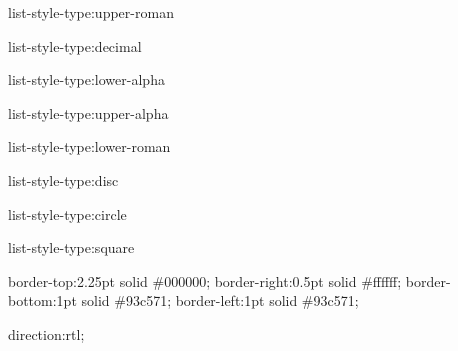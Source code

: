 \documentclass[12pt,twoside,openany]{book}
\newenvironment{lateiDocument}{}{}
\begin{document}
\begin{lateiDocument}
\begin{teiElement}[name={TEI}]
\begin{teiElement}[name={teiHeader}]
\begin{teiElement}[name={encodingDesc}]
\begin{teiElement}[name={tagsDecl}]
				\begin{teiElement}[name={rendition},xmlid={rendition\_list1},scheme={css}]
list-style-type:upper-roman
\end{teiElement}
				\begin{teiElement}[name={rendition},xmlid={rendition\_list2},scheme={css}]
list-style-type:decimal
\end{teiElement}
				\begin{teiElement}[name={rendition},xmlid={rendition\_list3},scheme={css}]
list-style-type:lower-alpha
\end{teiElement}
				\begin{teiElement}[name={rendition},xmlid={rendition\_list4},scheme={css}]
list-style-type:upper-alpha
\end{teiElement}
				\begin{teiElement}[name={rendition},xmlid={rendition\_list5},scheme={css}]
list-style-type:lower-roman
\end{teiElement}
				\begin{teiElement}[name={rendition},xmlid={rendition\_list6},scheme={css}]
list-style-type:disc
\end{teiElement}
				\begin{teiElement}[name={rendition},xmlid={rendition\_list7},scheme={css}]
list-style-type:circle
\end{teiElement}
				\begin{teiElement}[name={rendition},xmlid={rendition\_list8},scheme={css}]
list-style-type:square
\end{teiElement}
				\begin{teiElement}[name={rendition},scheme={css},xmlid={Cell}]
border-top:2.25pt solid \#000000; border-right:0.5pt
					solid \#ffffff; border-bottom:1pt solid \#93c571; border-left:1pt solid \#93c571; 
\end{teiElement}
				\begin{teiElement}[name={rendition},xmlid={rtl},scheme={css}]
direction:rtl;
\end{teiElement}
			
\end{teiElement}
		
\end{teiElement}
		\begin{teiElement}[name={profileDesc}]

			\begin{teiElement}[name={langUsage}]

				\begin{teiElement}[name={language},ident={fr-FR}]


\end{teiElement}
\end{teiElement}
\end{teiElement}
\end{teiElement}
\end{teiElement}
\end{lateiDocument}
\end{document}
